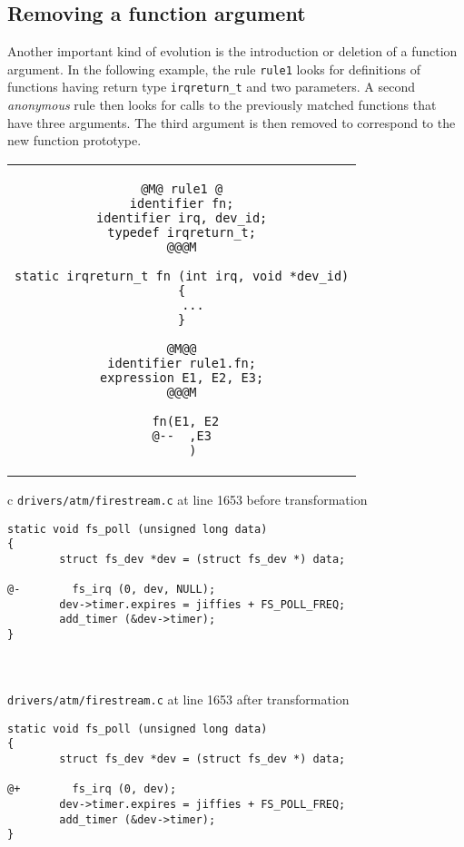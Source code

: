 \newpage
\subsection{Removing a function argument}

Another important kind of evolution is the introduction or deletion of a
function argument. In the following example, the rule \texttt{rule1} looks
for definitions of functions having return type \texttt{irqreturn\_t} and
two parameters. A second \emph{anonymous} rule then looks for calls to the
previously matched functions that have three arguments. The third argument
is then removed to correspond to the new function prototype.\\

\begin{tabular}{c}
\begin{lstlisting}[language=Cocci,name=arg]
@M@ rule1 @
identifier fn;
identifier irq, dev_id;
typedef irqreturn_t;
@@@M

static irqreturn_t fn (int irq, void *dev_id)
{
   ...
}

@M@@
identifier rule1.fn;
expression E1, E2, E3;
@@@M

 fn(E1, E2
@--  ,E3
   )
\end{lstlisting}\\
\end{tabular}

\vspace{1cm}

\begin{tabular}{c}
  \texttt{drivers/atm/firestream.c} at line 1653 before transformation\\
\begin{lstlisting}[language=PatchC]
static void fs_poll (unsigned long data)
{
        struct fs_dev *dev = (struct fs_dev *) data;

@-        fs_irq (0, dev, NULL);
        dev->timer.expires = jiffies + FS_POLL_FREQ;
        add_timer (&dev->timer);
}
\end{lstlisting}\\
\vspace{1cm}
\\


  \texttt{drivers/atm/firestream.c} at line 1653 after transformation\\
\begin{lstlisting}[language=PatchC]
static void fs_poll (unsigned long data)
{
        struct fs_dev *dev = (struct fs_dev *) data;

@+        fs_irq (0, dev);
        dev->timer.expires = jiffies + FS_POLL_FREQ;
        add_timer (&dev->timer);
}
\end{lstlisting}\\
\end{tabular}

